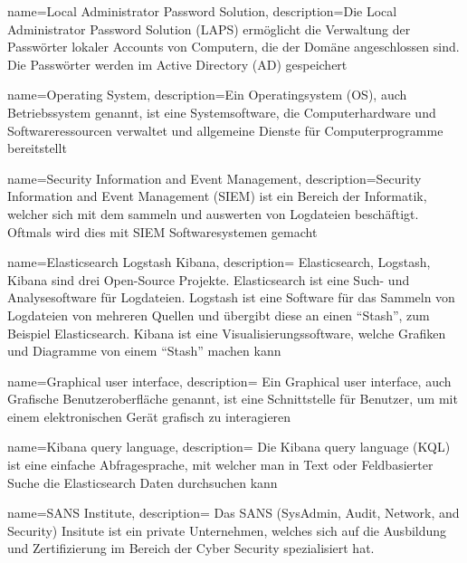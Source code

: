 {
    name=Local Administrator Password Solution,
    description={Die Local Administrator Password Solution (LAPS) ermöglicht die Verwaltung der Passwörter lokaler Accounts von Computern, die der Domäne angeschlossen sind. Die Passwörter werden im Active Directory (AD) gespeichert}
}

{
    name=Operating System,
    description={Ein Operatingsystem (OS), auch Betriebssystem genannt, ist eine Systemsoftware, die Computerhardware und Softwareressourcen verwaltet und allgemeine Dienste für Computerprogramme bereitstellt}
}

{
    name=Security Information and Event Management,
    description={Security Information and Event Management (SIEM) ist ein Bereich der Informatik, welcher sich mit dem sammeln und auswerten von Logdateien beschäftigt.
    Oftmals wird dies mit SIEM Softwaresystemen gemacht}
}

{
    name=Elasticsearch Logstash Kibana,
    description={
        Elasticsearch, Logstash, Kibana sind drei Open-Source Projekte. Elasticsearch ist eine Such- und Analysesoftware für Logdateien.
        Logstash ist eine Software für das Sammeln von Logdateien von mehreren Quellen und übergibt diese an einen ``Stash'', zum Beispiel Elasticsearch.
        Kibana ist eine Visualisierungssoftware, welche Grafiken und Diagramme von einem ``Stash'' machen kann
    }
}

{
    name=Graphical user interface,
    description={
        Ein Graphical user interface, auch Grafische Benutzeroberfläche genannt, ist eine Schnittstelle für Benutzer, um mit einem elektronischen Gerät grafisch zu interagieren
    }
}

{
    name=Kibana query language,
    description={
        Die Kibana query language (KQL) ist eine einfache Abfragesprache, mit welcher man in Text oder Feldbasierter Suche die Elasticsearch Daten durchsuchen kann
    }
}

{
    name=SANS Institute,
    description={
        Das SANS (SysAdmin, Audit, Network, and Security) Insitute ist ein private Unternehmen, welches sich auf die Ausbildung und Zertifizierung im Bereich der Cyber Security spezialisiert hat. 
    }
}
